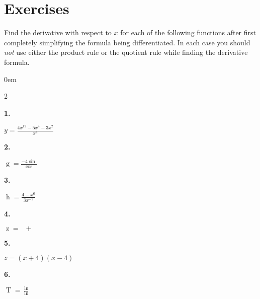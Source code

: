 \documentclass[12pt,]{book}
\theoremstyle{plain}
\theoremstyle{definition}
\numberwithin{equation}{section}
\newenvironment{exercisegroup}%
{\medskip\noindent}%
{\par\bigskip}%
\newlength{\exercisegroupindent}%
\newlength{\exercisegroupitemwidth}%
\newenvironment{exercisegrouplist}%
{\vspace{-\partopsep}%
\begin{adjustwidth}{\exercisegroupindent}{0em}}%
{\end{adjustwidth}%
\vspace{-\partopsep}%
\vspace{\baselineskip}}%
\newenvironment{exercisegroupbycol}[1]%
{\begin{exercisegrouplist}%
\vspace{-\multicolsep}%
\begin{multicols}{#1}%
\setlength{\parindent}{0em}%
\setlength{\exercisegroupitemwidth}{\linewidth}}%
{\end{multicols}%
\vspace{-\multicolsep}%
\end{exercisegrouplist}}%
\newenvironment{exercisegroupitem}[1]%
{\begin{minipage}[t]{\exercisegroupitemwidth}
\vspace{0pt}%
{\bfseries#1}%
\rule{0pt}{\baselineskip}}{\strut%
\end{minipage}%
\hspace{\columnsep}}%
\providecommand\phantomsection{}
\newcommand{\fe}[2]{\mathop{{#1}{\left(#2\right)}}}
\begin{document}
\section*{Exercises}\label{exercises-37}

\begin{exercisegroup}%
Find the derivative with respect to \(x\) for each of the following functions after first completely simplifying the formula being differentiated.  In each case you should \emph{not} use either the product rule or the quotient rule while finding the derivative formula.%
\par
\begin{exercisegroupbycol}{2}%
\begin{exercisegroupitem}{1. }\phantomsection\hypertarget{exercise-321}{\null}
\(y=\frac{4x^{12}-5x^4+3x^2}{x^4}\)%
\end{exercisegroupitem}%
\par%
\begin{exercisegroupitem}{2. }\phantomsection\hypertarget{exercise-322}{\null}
\(\fe{g}{x}=\frac{-4\fe{\sin}{x}}{\fe{\cos}{x}}\)%
\end{exercisegroupitem}%
\par%
\begin{exercisegroupitem}{3. }\phantomsection\hypertarget{exercise-323}{\null}
\(\fe{h}{x}=\frac{4-x^6}{3x^{-2}}\)%
\end{exercisegroupitem}%
\par%
\begin{exercisegroupitem}{4. }\phantomsection\hypertarget{exercise-324}{\null}
\(\fe{z}{x}=\fe{\sin^2}{x}+\fe{\cos^2}{x}\)%
\end{exercisegroupitem}%
\par%
\begin{exercisegroupitem}{5. }\phantomsection\hypertarget{exercise-325}{\null}
\(z=(x+4)(x-4)\)%
\end{exercisegroupitem}%
\par%
\begin{exercisegroupitem}{6. }\phantomsection\hypertarget{exercise-326}{\null}
\(\fe{T}{x}=\frac{\fe{\ln}{x}}{\fe{\ln}{x^2}}\)%
\end{exercisegroupitem}%
\par%
\end{exercisegroupbycol}%
\end{exercisegroup}%
\typeout{************************************************}
\typeout{************************************************}
\end{document}
